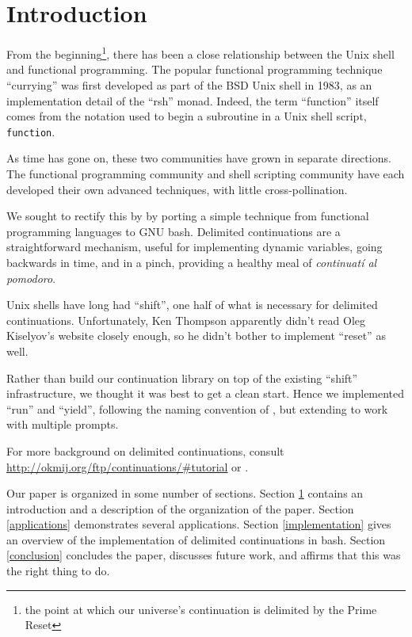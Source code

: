 \documentclass[sigplan]{acmart}
\begin{document}

\maketitle

\section{Introduction}\label{introduction}

From the beginning\footnote{the point at which our universe's continuation is delimited by the Prime Reset},
there has been a close relationship between the Unix shell and functional programming.
The popular functional programming technique ``currying'' was first developed as part of the BSD Unix shell in 1983,
as an implementation detail of the ``rsh'' monad.
Indeed, the term ``function'' itself comes from the notation used to begin a subroutine in a Unix shell script, \texttt{function}.

As time has gone on, these two communities have grown in separate directions.
The functional programming community and shell scripting community have each developed their own advanced techniques,
with little cross-pollination.

We sought to rectify this by by porting a simple technique from functional programming languages to GNU bash.
Delimited continuations are a straightforward mechanism,
useful for implementing dynamic variables,
going backwards in time,
and in a pinch, providing a healthy meal of \textit{continuat\'i al pomodoro}.

Unix shells have long had ``shift'',
one half of what is necessary for delimited continuations.
Unfortunately, Ken Thompson apparently didn't read Oleg Kiselyov's website closely enough,
so he didn't bother to implement ``reset'' as well.

Rather than build our continuation library on top of the existing ``shift'' infrastructure,
we thought it was best to get a clean start.
Hence we implemented ``run'' and ``yield'', following the naming convention of \cite{yield},
but extending to work with multiple prompts.

For more background on delimited continuations, consult \url{http://okmij.org/ftp/continuations/#tutorial} or \cite{delimcc}.

Our paper is organized in some number of sections.
Section \ref{introduction} contains an introduction and a description of the organization of the paper.
Section \ref{applications} demonstrates several applications.
Section \ref{implementation} gives an overview of the implementation of delimited continuations in bash.
Section \ref{conclusion} concludes the paper, discusses future work, and affirms that this was the right thing to do.
\end{document}
